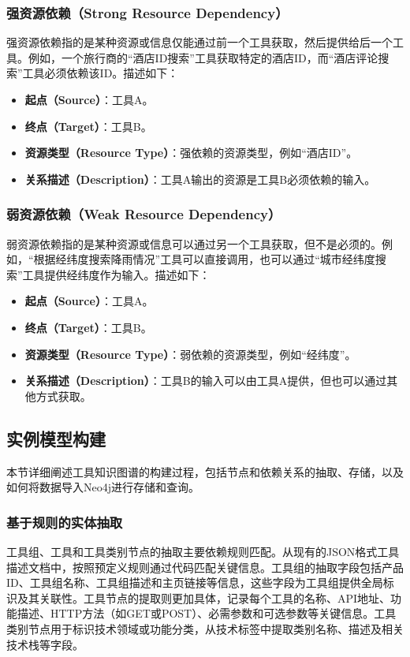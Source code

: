 \subsubsection{强资源依赖（Strong Resource Dependency）}
强资源依赖指的是某种资源或信息仅能通过前一个工具获取，然后提供给后一个工具。例如，一个旅行商的“酒店ID搜索”工具获取特定的酒店ID，而“酒店评论搜索”工具必须依赖该ID。描述如下：
\begin{itemize}
    \item \textbf{起点（Source）}：工具A。
    \item \textbf{终点（Target）}：工具B。
    \item \textbf{资源类型（Resource Type）}：强依赖的资源类型，例如``酒店ID''。
    \item \textbf{关系描述（Description）}：工具A输出的资源是工具B必须依赖的输入。
\end{itemize}

\subsubsection{弱资源依赖（Weak Resource Dependency）}
弱资源依赖指的是某种资源或信息可以通过另一个工具获取，但不是必须的。例如，“根据经纬度搜索降雨情况”工具可以直接调用，也可以通过“城市经纬度搜索”工具提供经纬度作为输入。描述如下：
\begin{itemize}
    \item \textbf{起点（Source）}：工具A。
    \item \textbf{终点（Target）}：工具B。
    \item \textbf{资源类型（Resource Type）}：弱依赖的资源类型，例如``经纬度''。
    \item \textbf{关系描述（Description）}：工具B的输入可以由工具A提供，但也可以通过其他方式获取。
\end{itemize}

\subsection{实例模型构建}

本节详细阐述工具知识图谱的构建过程，包括节点和依赖关系的抽取、存储，以及如何将数据导入Neo4j进行存储和查询。

\subsubsection{基于规则的实体抽取}

工具组、工具和工具类别节点的抽取主要依赖规则匹配。从现有的JSON格式工具描述文档中，按照预定义规则通过代码匹配关键信息。工具组的抽取字段包括产品ID、工具组名称、工具组描述和主页链接等信息，这些字段为工具组提供全局标识及其关联性。工具节点的提取则更加具体，记录每个工具的名称、API地址、功能描述、HTTP方法（如GET或POST）、必需参数和可选参数等关键信息。工具类别节点用于标识技术领域或功能分类，从技术标签中提取类别名称、描述及相关技术栈等字段。

